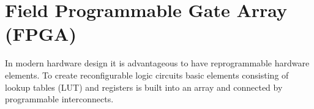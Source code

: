 
\chapter{Field Programmable Gate Array (FPGA)}
In modern hardware design it is advantageous to have reprogrammable hardware elements. To create reconfigurable logic circuits basic elements consisting of lookup tables (LUT) and registers is built into an array and connected by programmable interconnects.
